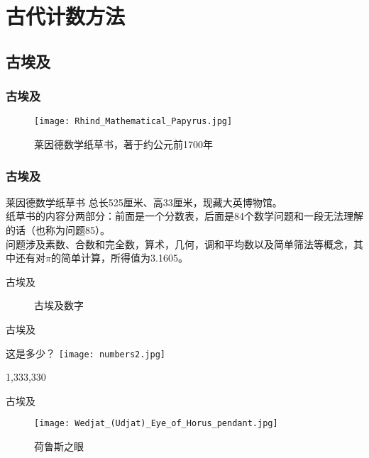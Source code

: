 \section{古代计数方法}

\subsection{古埃及}

\begin{frame}\frametitle{古埃及}
	\begin{figure}\centering
		\texttt{[image: Rhind\_Mathematical\_Papyrus.jpg]}
		\caption{莱因德数学纸草书，著于约公元前1700年}
	\end{figure}
\end{frame}

\begin{frame}\frametitle{古埃及}
	\begin{block}{莱因德数学纸草书}
		总长525厘米、高33厘米，现藏大英博物馆。\\
		纸草书的内容分两部分：前面是一个分数表，后面是84个数学问题和一段无法理解的话（也称为问题85）。\\
		问题涉及素数、合数和完全数，算术，几何，调和平均数以及简单筛法等概念，其中还有对$\pi$的简单计算，所得值为3.1605。
	\end{block}
\end{frame}

\begin{frame}{古埃及}
	\begin{figure}\centering
	\caption{古埃及数字}
	\end{figure}
\end{frame}

\begin{frame}{古埃及}
\begin{exampleblock}{这是多少？}
	\texttt{[image: numbers2.jpg]}
\end{exampleblock}\pause
\begin{answer}
	1,333,330
\end{answer}
\end{frame}

\begin{frame}{古埃及}
	\begin{figure}\centering
		\texttt{[image: Wedjat\_(Udjat)\_Eye\_of\_Horus\_pendant.jpg]}
		\caption{荷鲁斯之眼}
	\end{figure}
\end{frame}

